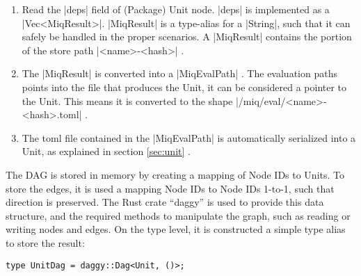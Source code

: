 \begin{enumerate}
    \item Read the |deps| field of (Package) Unit node.
    |deps| is implemented as a |Vec<MiqResult>|. |MiqResult|
    is a type-alias for a |String|, such that it can safely
    be handled in the proper scenarios. A |MiqResult|
    contains the portion of the store path |<name>-<hash>| .

    \item The |MiqResult| is converted into a |MiqEvalPath|
    . The evaluation paths points into the file that
    produces the Unit, it can be considered a pointer to the
    Unit. This means it is converted to the shape
    |/miq/eval/<name>-<hash>.toml| .

    \item The toml file contained in the |MiqEvalPath| is
    automatically serialized into a Unit, as explained in
    section \ref{sec:unit} .
\end{enumerate}

The \ac{DAG} is stored in memory by creating a mapping of
Node IDs to Units. To store the edges, it is used a mapping Node IDs to
Node IDs 1-to-1, such that direction is preserved. The Rust
crate ``daggy'' \cite{DaggyRust} is used to provide this
data structure, and the required methods to manipulate the
graph, such as reading or writing nodes and edges. On the
type level, it is
constructed a simple type alias to store the result:

\begin{verbatim}
type UnitDag = daggy::Dag<Unit, ()>;
\end{verbatim}
